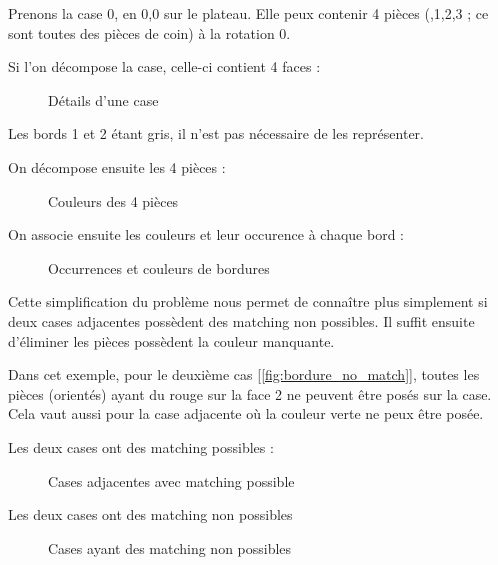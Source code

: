 	\begin{exmp}
		Prenons la case 0, en 0,0 sur le plateau. Elle peux contenir 4 pièces (,1,2,3 ; ce sont toutes des pièces de coin) à la rotation 0.
		
		Si l'on décompose la case, celle-ci contient 4 faces :
		
		\begin{figure}[H]
			

			\caption{Détails d'une case}\label{fig:case}
		\end{figure}
		
		Les bords 1 et 2 étant gris, il n'est pas nécessaire de les représenter. 
		\endminipage\hfill
	
		On décompose ensuite les 4 pièces :
		\begin{figure}[H]
			
			
			\caption{Couleurs des 4 pièces}\label{fig:4_pieces}
		\end{figure}
		\endminipage\hfill
			On associe ensuite les couleurs et leur occurence à chaque bord :
			\begin{figure}[H]
				
				
				\caption{Occurrences et couleurs de bordures}\label{fig:4_pieces_on_bordure}
			\end{figure}
		\endminipage\hfill
	\end{exmp}
	
	Cette simplification du problème nous permet de connaître plus simplement si deux cases adjacentes possèdent des matching non possibles.  Il suffit ensuite d'éliminer les pièces possèdent la couleur manquante.
		
	\begin{exmp} Dans cet exemple, pour le deuxième cas [\autoref{fig:bordure_no_match}], toutes les pièces (orientés) ayant du rouge sur la face 2 ne peuvent être posés sur la case. Cela vaut aussi pour la case adjacente où la couleur verte ne peux être posée.
			
		\minipage[t]{0.45\textwidth}
			Les deux cases ont des matching possibles :
			
			\begin{figure}[H]
				
				\caption{Cases adjacentes avec matching possible}\label{fig:bordure_match}
			\end{figure}
		
		\endminipage\hfill
		\minipage[t]{0.45\textwidth}
			Les deux cases ont des matching non possibles
			
			\begin{figure}[H]
				
				
				\caption{Cases ayant des matching non possibles}\label{fig:bordure_no_match}
			\end{figure}
			\endminipage\hfill
	\end{exmp}
	
